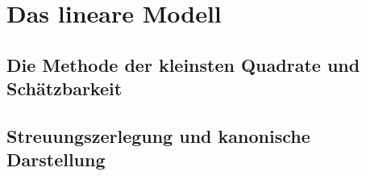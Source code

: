 \section{Das lineare Modell}

\subsection{Die Methode der kleinsten Quadrate und Schätzbarkeit}

\subsection{Streuungszerlegung und kanonische Darstellung}
